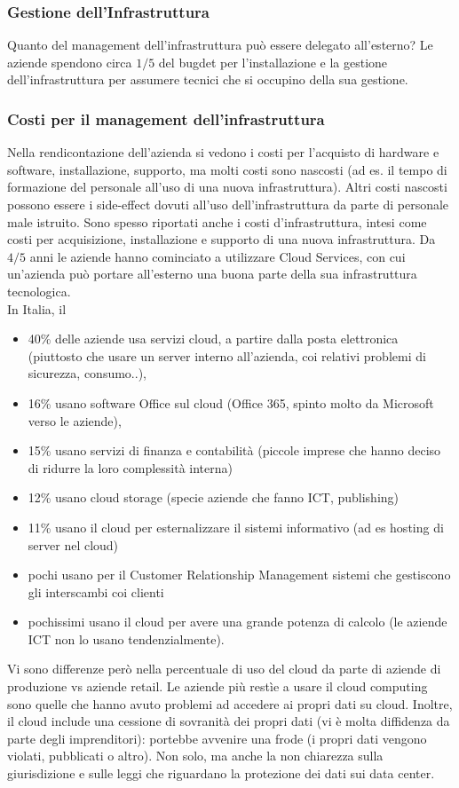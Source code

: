 \subsubsection{Gestione dell'Infrastruttura}
\label{subs:Gestione dell'Infrastruttura}
Quanto del management dell'infrastruttura pu\`o essere delegato all'esterno?
Le aziende spendono circa $1/5$ del bugdet per l'installazione e la gestione dell'infrastruttura
per assumere tecnici che si occupino della sua gestione.
\subsubsection{Costi per il management dell'infrastruttura}
\label{subs:Costi per il management dell'infrastruttura}
Nella rendicontazione dell'azienda si vedono i costi per l'acquisto di hardware e software, installazione,
supporto, ma molti costi sono nascosti (ad es. il tempo di formazione del personale
all'uso di una nuova infrastruttura). Altri costi nascosti possono essere i side-effect
dovuti all'uso dell'infrastruttura da parte di personale male istruito.
Sono spesso riportati anche i costi d'infrastruttura, intesi come costi per acquisizione, installazione
e supporto di una nuova infrastruttura.
Da $4/5$ anni le aziende hanno cominciato a utilizzare Cloud Services, con cui
un'azienda pu\`o portare all'esterno una buona parte della sua infrastruttura tecnologica.\\
In Italia, il
\begin{itemize}

\item 40\% delle aziende usa servizi cloud, a partire dalla posta elettronica (piut\-tosto che
usare un server interno all'azienda, coi relativi problemi di sicurezza, consumo..),
\item 16\% usano software Office sul cloud (Office 365, spinto molto da Microsoft verso le aziende),
\item 15\% usano servizi di finanza e contabilit\`a (piccole imprese che hanno deciso di ridurre
la loro complessit\`a interna)
\item 12\% usano cloud storage (specie aziende che fanno ICT, publishing)
\item 11\% usano il cloud per esternalizzare il sistemi informativo (ad es hosting di server
nel cloud)
\item pochi usano per il Customer Relationship Management sistemi che gestiscono gli interscambi coi clienti
\item pochissimi usano il cloud per avere una grande potenza di calcolo (le aziende ICT non lo usano tendenzialmente).
 \end{itemize}
Vi sono differenze per\`o nella percentuale di uso del cloud da parte di aziende di produzione vs
aziende retail.
Le aziende pi\`u rest\`ie a usare il cloud computing sono quelle che hanno avuto problemi ad accedere
ai propri dati su cloud. Inoltre, il cloud include una cessione di sovranit\`a dei propri dati (vi \`e molta
diffidenza da parte degli imprenditori): portebbe avvenire una frode (i propri dati vengono violati, pubblicati o altro).
Non solo, ma anche la non chiarezza sulla giurisdizione e sulle leggi che riguardano la protezione
dei dati sui data center.

